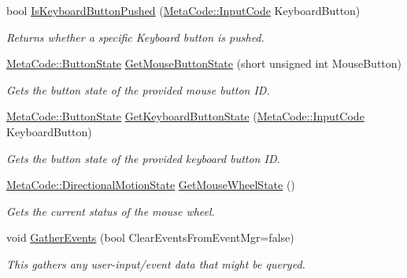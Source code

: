 \begin{DoxyCompactItemize}
\item 
bool \hyperlink{classphys_1_1InputQueryTool_a6f210acb5f4e2fe052b0c3c7c3ec9418}{IsKeyboardButtonPushed} (\hyperlink{classphys_1_1MetaCode_a3e501cbb5bf0f6f1fdb7211465bda8d8}{MetaCode::InputCode} KeyboardButton)
\begin{DoxyCompactList}\small\item\em Returns whether a specific Keyboard button is pushed. \item\end{DoxyCompactList}\item 
\hyperlink{classphys_1_1MetaCode_a2fdfb26b3e50ceb0ccc60bfc4c3d6ac2}{MetaCode::ButtonState} \hyperlink{classphys_1_1InputQueryTool_a1ef8b70af163d8bc703fd16c3fcce22d}{GetMouseButtonState} (short unsigned int MouseButton)
\begin{DoxyCompactList}\small\item\em Gets the button state of the provided mouse button ID. \item\end{DoxyCompactList}\item 
\hyperlink{classphys_1_1MetaCode_a2fdfb26b3e50ceb0ccc60bfc4c3d6ac2}{MetaCode::ButtonState} \hyperlink{classphys_1_1InputQueryTool_ad279cce170ff68ba9f343f6b22b2c621}{GetKeyboardButtonState} (\hyperlink{classphys_1_1MetaCode_a3e501cbb5bf0f6f1fdb7211465bda8d8}{MetaCode::InputCode} KeyboardButton)
\begin{DoxyCompactList}\small\item\em Gets the button state of the provided keyboard button ID. \item\end{DoxyCompactList}\item 
\hyperlink{classphys_1_1MetaCode_ad6ed6266b5f4219a6f5da29ebe018757}{MetaCode::DirectionalMotionState} \hyperlink{classphys_1_1InputQueryTool_aa214535768fa838ad9799d3e5ca3cece}{GetMouseWheelState} ()
\begin{DoxyCompactList}\small\item\em Gets the current status of the mouse wheel. \item\end{DoxyCompactList}\item 
void \hyperlink{classphys_1_1InputQueryTool_a9779d812418f1fddb0880df0c607242b}{GatherEvents} (bool ClearEventsFromEventMgr=false)
\begin{DoxyCompactList}\small\item\em This gathers any user-\/input/event data that might be queryed. \item\end{DoxyCompactList}\end{DoxyCompactItemize}
